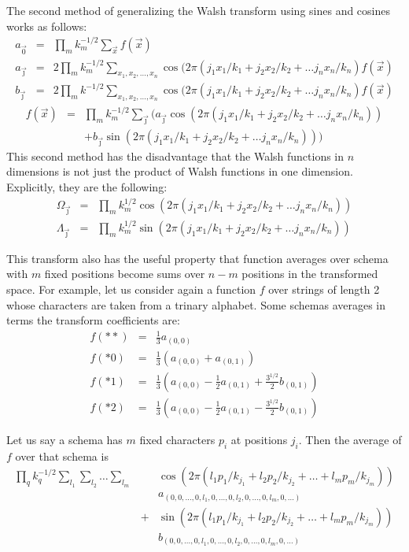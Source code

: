 The second method of generalizing the Walsh
transform using sines and cosines works as follows:
\begin{eqnarray}
a_{\vec{0}} &=& \prod_m{k_m^{-1/2}} \sum_{\vec{x}} {f(\vec{x})} \nonumber\\
a_{\vec{\jmath}} &=& 2 \prod_m{k_m^{-1/2}} \sum_{x_1,x_2,\ldots,x_n}
	{\cos(2 \pi (j_1 x_1/k_1+j_2 x_2/k_2+\ldots j_n x_n/k_n)
	f(\vec{x})} \nonumber\\
b_{\vec{\jmath}} &=& 2 \prod_m{k^{-1/2}} \sum_{x_1,x_2,\ldots,x_n}
	{\cos(2 \pi (j_1 x_1/k_1+j_2 x_2/k_2+\ldots j_n x_n/k_n)
	f(\vec{x})}
\end{eqnarray}
\begin{eqnarray}
f(\vec{x}) &=& \prod_m{k_m^{-1/2}} \sum_{\vec{\jmath}}
{}( 
a_{\vec{\jmath}} \cos(2 \pi (j_1 x_1/k_1+j_2 x_2/k_2+\ldots j_n x_n/k_n)) 
	\nonumber\\
&& +
b_{\vec{\jmath}} \sin(2 \pi (j_1 x_1/k_1+j_2 x_2/k_2+\ldots j_n x_n/k_n))
)
\end{eqnarray}
This second method has the disadvantage that the Walsh functions in $n$
dimensions is not just the product of Walsh functions in one dimension.
Explicitly, they are the following:
\begin{eqnarray}
\Omega_{\vec{\jmath}} &=& \prod_m{k_m^{1/2}} \cos(2 \pi (j_1 x_1/k_1 +
	j_2 x_2/k_2 + \ldots j_n x_n /k_n)) \nonumber\\
\Lambda_{\vec{\jmath}} &=& \prod_m{k_m^{1/2}} \sin(2 \pi (j_1 x_1/k_1 +
	j_2 x_2/k_2 + \ldots j_n x_n /k_n))
\end{eqnarray}

This transform also has the useful property that function averages over schema
with $m$ fixed positions become sums over $n-m$ positions in the transformed
space.  For example, let us consider again a function $f$ over strings of
length 2 whose characters are taken from a trinary alphabet.  Some schemas
averages in terms the transform coefficients are:
\begin{eqnarray}
f(**) &=& \frac{1}{3} a_{(0,0)} \nonumber \\
f(*0) &=& \frac{1}{3} (a_{(0,0)} + a_{(0,1)}) \nonumber\\
f(*1) &=& \frac{1}{3} (a_{(0,0)} -\frac{1}{2} a_{(0,1)} +\frac{3^{1/2}}{2} b_{(0,1)}) \nonumber\\
f(*2) &=& \frac{1}{3} (a_{(0,0)} -\frac{1}{2} a_{(0,1)} -\frac{3^{1/2}}{2} b_{(0,1)})
\end{eqnarray}

Let us say a schema has $m$ fixed characters $p_i$ at positions $j_i$.
Then the average of $f$ over that schema is
\begin{eqnarray}
\prod_q{k_q^{-1/2}}
\sum_{l_1} \sum_{l_2} \ldots \sum_{l_m} & &
\cos(2 \pi (l_1 p_1/k_{j_1}+l_2 p_2/k_{j_2} +\ldots+l_m p_m/k_{j_m}))\nonumber\\
&& a_{(0,0,\ldots,0,l_1,0,\ldots,0,l_2,0,\ldots,0,l_m,0,\ldots)}\nonumber\\
&+&
\sin(2 \pi (l_1 p_1/k_{j_1}+l_2 p_2/k_{j_2} +\ldots+l_m p_m/k_{j_m}))\nonumber\\
&& b_{(0,0,\ldots,0,l_1,0,\ldots,0,l_2,0,\ldots,0,l_m,0,\ldots)}
\end{eqnarray}

